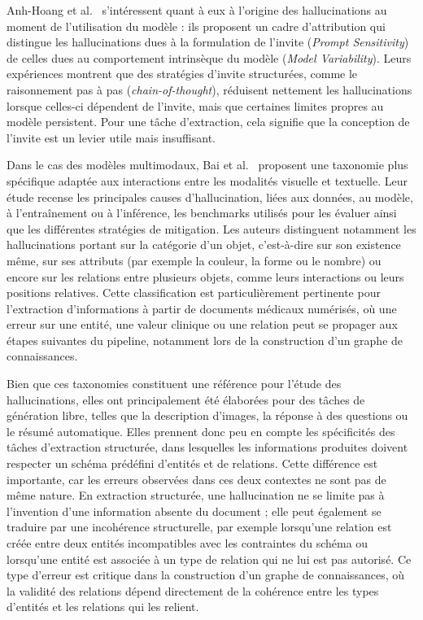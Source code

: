 Anh-Hoang et al.~\cite{anhhoang2025survey} s'intéressent quant à eux à l'origine des hallucinations au moment de l'utilisation du modèle : ils proposent un cadre d'attribution qui distingue les hallucinations dues à la formulation de l'invite (\textit{Prompt Sensitivity}) de celles dues au comportement intrinsèque du modèle (\textit{Model Variability}). Leurs expériences montrent que des stratégies d'invite structurées, comme le raisonnement pas à pas (\textit{chain-of-thought}), réduisent nettement les hallucinations lorsque celles-ci dépendent de l'invite, mais que certaines limites propres au modèle persistent. Pour une tâche d'extraction, cela signifie que la conception de l'invite est un levier utile mais insuffisant.

Dans le cas des modèles multimodaux, Bai et al.~\cite{bai2025survey} proposent une taxonomie plus spécifique adaptée aux interactions entre les modalités visuelle et textuelle. Leur étude recense les principales causes d'hallucination, liées aux données, au modèle, à l'entraînement ou à l'inférence, les benchmarks utilisés pour les évaluer ainsi que les différentes stratégies de mitigation. Les auteurs distinguent notamment les hallucinations portant sur la catégorie d'un objet, c'est-à-dire sur son existence même, sur ses attributs (par exemple la couleur, la forme ou le nombre) ou encore sur les relations entre plusieurs objets, comme leurs interactions ou leurs positions relatives. Cette classification est particulièrement pertinente pour l'extraction d'informations à partir de documents médicaux numérisés, où une erreur sur une entité, une valeur clinique ou une relation peut se propager aux étapes suivantes du pipeline, notamment lors de la construction d'un graphe de connaissances.

Bien que ces taxonomies constituent une référence pour l'étude des hallucinations, elles ont principalement été élaborées pour des tâches de génération libre, telles que la description d'images, la réponse à des questions ou le résumé automatique. Elles prennent donc peu en compte les spécificités des tâches d'extraction structurée, dans lesquelles les informations produites doivent respecter un schéma prédéfini d'entités et de relations. Cette différence est importante, car les erreurs observées dans ces deux contextes ne sont pas de même nature. En extraction structurée, une hallucination ne se limite pas à l'invention d'une information absente du document ; elle peut également se traduire par une incohérence structurelle, par exemple lorsqu'une relation est créée entre deux entités incompatibles avec les contraintes du schéma ou lorsqu'une entité est associée à un type de relation qui ne lui est pas autorisé. Ce type d'erreur est critique dans la construction d'un graphe de connaissances, où la validité des relations dépend directement de la cohérence entre les types d'entités et les relations qui les relient.


